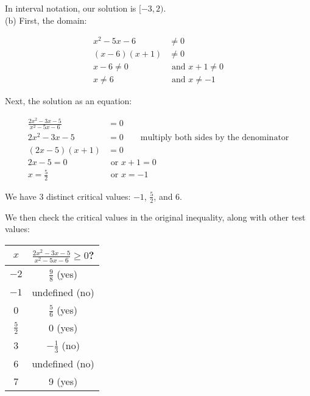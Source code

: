 \begin{solution}
In interval notation, our solution is $[-3, 2)$. \\[18pt]

(b) First, the domain:

\begin{align*}
    x^2 - 5x - 6 &\neq 0 \\
    (x - 6)(x + 1) &\neq 0 \\
    x-6\neq 0 &\text{ and } x + 1 \neq 0 \\
    x \neq 6 &\text{ and } x \neq -1 
\end{align*}

Next, the solution as an equation:

\begin{align*}
    \frac{2x^2-3x-5}{x^2-5x-6} &= 0 \\
    2x^2 - 3x - 5 &= 0 \qquad \text{multiply both sides by the denominator} \\
    (2x - 5)(x + 1) &= 0 \\
    2x - 5 = 0 &\text{ or } x + 1 = 0 \\
    x = \tfrac{5}{2} &\text{ or } x = -1
\end{align*}

\bigskip 

We have 3 distinct critical values: $-1$, $\tfrac{5}{2}$, and 6. \newline 

\begin{center}
\end{center}

We then check the critical values in the original inequality, along with other test values:

\begin{center}
\setlength{\extrarowheight}{4pt}
\begin{tabular}{c|c}
    $x$ & $\frac{2x^2-3x-5}{x^2-5x-6} \geq 0$? \\ \hline 
    $-2$ & $\tfrac{9}{8}$ (yes) \\
    $-1$ & undefined (no) \\
    0 & $\tfrac{5}{6}$ (yes) \\
    $\tfrac{5}{2}$ & 0 (yes) \\
    3 & $-\tfrac{1}{3}$ (no) \\
    6 & undefined (no) \\
    7 & 9 (yes) 
\end{tabular}
\end{center}


\end{solution}
